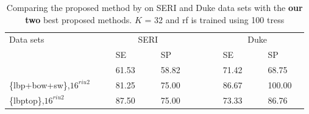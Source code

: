 \begin{table}
\caption{Comparing the proposed method by \cite{Venhuizen2015} on SERI and Duke data sets with the \textbf{our two} best proposed methods. $K$ = 32 and \ac{rf} is trained using 100 tress}
\centering
\begin{tabular}{lcclcclcccclcclc}
\toprule
Data sets 	& & &\multicolumn{4}{c}{SERI}& & & & &\multicolumn{4}{c}{Duke} & \\
  \cmidrule(l){2-8}  \cmidrule(l){10-16} 
	         & & & SE & & & SP & & & & & SE & & & SP & \\
\midrule
 \cite{Venhuizen2015} 		& & & 61.53 & & & 58.82 & & & & & 71.42 & & & 68.75 & \\	
\{\ac{lbp}+\ac{bow}+\ac{sw}\},$16^{riu2}$ 	& & & 81.25 & & & 75.00 & & & & & 86.67 & & & 100.00 &  \\
\{\ac{lbptop}\},$16^{riu2}$				& & & 87.50 & & & 75.00 & & & & & 73.33 & & & 86.76 &  \\
 		    					

\bottomrule
\end{tabular}
\label{tab:ComparisonRefandOurs}
\end{table}


